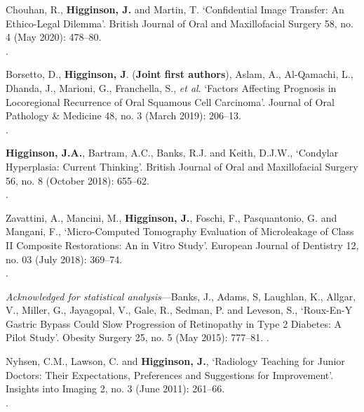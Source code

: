\vspace{0.1cm}

 Chouhan, R., \textbf{Higginson, J.} and Martin, T. `Confidential Image Transfer: An Ethico-Legal Dilemma’. British Journal of Oral and Maxillofacial Surgery 58, no. 4 (May 2020): 478–80. 
\\.

\vspace{0.1cm}

 Borsetto, D., \textbf{Higginson, J}. (\textbf{Joint first authors}), Aslam, A., Al‐Qamachi, L., Dhanda, J., Marioni, G., Franchella, S., \textit{et al}. `Factors Affecting Prognosis in Locoregional Recurrence of Oral Squamous Cell Carcinoma’. Journal of Oral Pathology \& Medicine 48, no. 3 (March 2019): 206–13.
\\.

\vspace{0.1cm}

 \textbf{Higginson, J.A.}, Bartram, A.C., Banks, R.J. and Keith, D.J.W., `Condylar Hyperplasia: Current Thinking’. British Journal of Oral and Maxillofacial Surgery 56, no. 8 (October 2018): 655–62. 
\\.

\vspace{0.1cm}

 Zavattini, A., Mancini, M., \textbf{Higginson, J.}, Foschi, F., Pasquantonio, G. and Mangani, F., `Micro-Computed Tomography Evaluation of Microleakage of Class II Composite Restorations: An in Vitro Study’. European Journal of Dentistry 12, no. 03 (July 2018): 369–74. 
\\.

\vspace{0.1cm}

 \textit{Acknowledged for statistical analysis}---Banks, J., Adams, S, Laughlan, K., Allgar, V., Miller, G., Jayagopal, V., Gale, R., Sedman, P. and Leveson, S., `Roux-En-Y Gastric Bypass Could Slow Progression of Retinopathy in Type 2 Diabetes: A Pilot Study’. Obesity Surgery 25, no. 5 (May 2015): 777–81. .

\vspace{0.1cm}

 Nyhsen, C.M., Lawson, C. and \textbf{Higginson, J.}, `Radiology Teaching for Junior Doctors: Their Expectations, Preferences and Suggestions for Improvement’. Insights into Imaging 2, no. 3 (June 2011): 261–66. 
\\.



